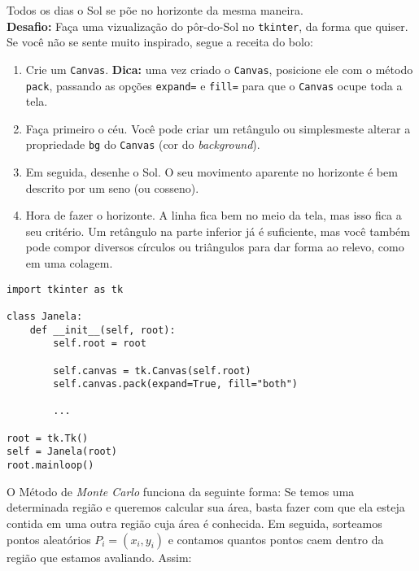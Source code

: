 \documentclass[12pt]{article}
\begin{document}
	
	Todos os dias o Sol se põe no horizonte da mesma maneira.\\
	
	\textbf{Desafio:} Faça uma vizualização do pôr-do-Sol no \texttt{tkinter}, da forma que quiser. Se você não se sente muito inspirado, segue a receita do bolo:
	
	\begin{enumerate}
		\item Crie um \texttt{Canvas}. \textbf{Dica:} uma vez criado o \texttt{Canvas}, posicione ele com o método \texttt{pack}, passando as opções \texttt{expand=} e \texttt{fill=} para que o \texttt{Canvas} ocupe toda a tela.
		\item Faça primeiro o céu. Você pode criar um retângulo ou simplesmeste alterar a propriedade \texttt{bg} do \texttt{Canvas} (cor do \textit{background}).
		
		\item Em seguida, desenhe o Sol. O seu movimento aparente no horizonte é bem descrito por um seno (ou cosseno).
		
		\item Hora de fazer o horizonte. A linha fica bem no meio da tela, mas isso fica a seu critério. Um retângulo na parte inferior já é suficiente, mas você também pode compor diversos círculos ou triângulos para dar forma ao relevo, como em uma colagem.
		
	\end{enumerate}

	\begin{lstlisting}
import tkinter as tk

class Janela:
	def __init__(self, root):
		self.root = root
		
		self.canvas = tk.Canvas(self.root)
		self.canvas.pack(expand=True, fill="both")
		
		...
		
root = tk.Tk()
self = Janela(root)
root.mainloop()
	\end{lstlisting}

	
	O Método de \emph{Monte Carlo} funciona da seguinte forma: Se temos uma determinada região e queremos calcular sua área, basta fazer com que ela esteja contida em uma outra região cuja área é conhecida. Em seguida, sorteamos pontos aleatórios $P_{i} = (x_{i}, y_{i})$ e contamos quantos pontos caem dentro da região que estamos avaliando. Assim:
	
\end{document}

